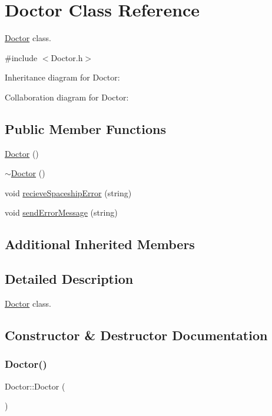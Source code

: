 \hypertarget{classDoctor}{}\section{Doctor Class Reference}
\label{classDoctor}


\hyperlink{classDoctor}{Doctor} class.  




{\ttfamily \#include $<$Doctor.\+h$>$}



Inheritance diagram for Doctor\+:


Collaboration diagram for Doctor\+:
\subsection*{Public Member Functions}
\begin{DoxyCompactItemize}
\item 
\hyperlink{classDoctor_ac71a90316796a8e72a8d9db536de274a}{Doctor} ()
\item 
\hyperlink{classDoctor_a1481ccfafebc7a2424d3659a0223ebfe}{$\sim$\+Doctor} ()
\item 
void \hyperlink{classDoctor_a820dca3b9f05d3f69c47bd7318923b88}{recieve\+Spaceship\+Error} (string)
\item 
void \hyperlink{classDoctor_a5a524981ce52102f975cf9c569137ce5}{send\+Error\+Message} (string)
\end{DoxyCompactItemize}
\subsection*{Additional Inherited Members}


\subsection{Detailed Description}
\hyperlink{classDoctor}{Doctor} class. 

\subsection{Constructor \& Destructor Documentation}
\mbox{\label{classDoctor_ac71a90316796a8e72a8d9db536de274a}} 
\subsubsection{\texorpdfstring{Doctor()}{Doctor()}}
{\footnotesize\ttfamily Doctor\+::\+Doctor (\begin{DoxyParamCaption}{ }\end{DoxyParamCaption})\hspace{0.3cm}{\ttfamily [inline]}}

